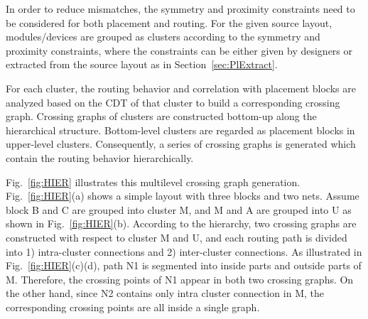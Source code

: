     In order to reduce mismatches, the symmetry and proximity constraints need to be considered for both placement and routing. 
    For the given source layout, modules/devices are grouped as clusters according to the symmetry and proximity constraints, 
    where the constraints can be either given by designers or extracted from the source layout as in Section~\ref{sec:PlExtract}.

    For each cluster, the routing behavior and correlation with placement blocks are analyzed based on the CDT of that cluster to build a corresponding crossing graph. 
    Crossing graphs of clusters are constructed bottom-up along the hierarchical structure. 
    Bottom-level clusters are regarded as placement blocks in upper-level clusters. 
    Consequently, a series of crossing graphs is generated which contain the routing behavior hierarchically.

    Fig.~\ref{fig:HIER} illustrates this multilevel crossing graph generation.
    Fig.~\ref{fig:HIER}(a) shows a simple layout with three blocks and two nets.
    Assume block B and C are grouped into cluster M, and M and A are grouped into U as shown in Fig.~\ref{fig:HIER}(b).
    According to the hierarchy, two crossing graphs are constructed with respect to cluster M and U, and
    each routing path is divided into 1) intra-cluster connections and 2) inter-cluster connections. 
    As illustrated in Fig.~\ref{fig:HIER}(c)(d), path N1 is segmented into inside parts and outside parts of M. 
    Therefore, the crossing points of N1 appear in both two crossing graphs. 
    On the other hand, since N2 contains only intra cluster connection in M, the corresponding crossing points are all inside a single graph. 

    

